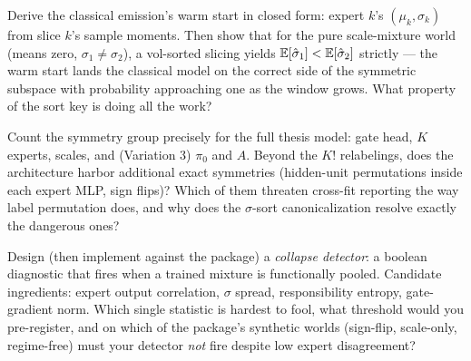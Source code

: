 \begin{exercise}\label{ex:8-classical}
Derive the classical emission's warm start in closed form: expert $k$'s
$(\mu_k, \sigma_k)$ from slice $k$'s sample moments. Then show that for
the pure scale-mixture world (means zero, $\sigma_1 \ne \sigma_2$), a
vol-sorted slicing yields $\mathbb{E}[\hat\sigma_1] < \mathbb{E}[\hat\sigma_2]$
strictly --- the warm start lands the classical model on the correct
side of the symmetric subspace with probability approaching one as the
window grows. What property of the sort key is doing all the work?
\end{exercise}

\begin{exercise}\label{ex:8-permcount}
Count the symmetry group precisely for the full thesis model: gate
head, $K$ experts, scales, and (Variation 3) $\pi_0$ and $A$. Beyond
the $K!$ relabelings, does the architecture harbor additional exact
symmetries (hidden-unit permutations inside each expert MLP, sign
flips)? Which of them threaten cross-fit reporting the way label
permutation does, and why does the $\sigma$-sort canonicalization
resolve exactly the dangerous ones?
\end{exercise}

\begin{exercise}\label{ex:8-detector}
Design (then implement against the package) a \emph{collapse detector}:
a boolean diagnostic that fires when a trained mixture is functionally
pooled. Candidate ingredients: expert output correlation, $\sigma$
spread, responsibility entropy, gate-gradient norm. Which single
statistic is hardest to fool, what threshold would you pre-register,
and on which of the package's synthetic worlds (sign-flip, scale-only,
regime-free) must your detector \emph{not} fire despite low expert
disagreement?
\end{exercise}
